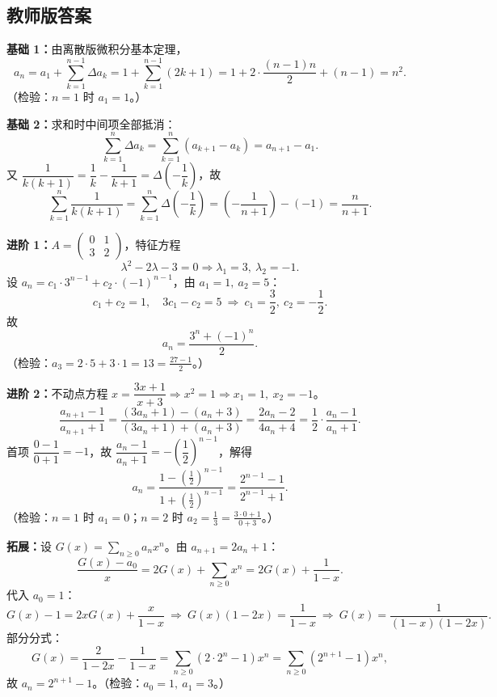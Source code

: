\begin{afterclass}
\subsection*{教师版答案}
\begin{solution}
\textbf{基础 1：}由离散版微积分基本定理，
\[
  a_n=a_1+\sum_{k=1}^{n-1}\Delta a_k
  =1+\sum_{k=1}^{n-1}(2k+1)
  =1+2\cdot\frac{(n-1)n}2+(n-1)=n^2 .
\]
（检验：$n=1$ 时 $a_1=1$。）
\end{solution}
\begin{solution}
\textbf{基础 2：}求和时中间项全部抵消：
\[
  \sum_{k=1}^n\Delta a_k=\sum_{k=1}^n(a_{k+1}-a_k)=a_{n+1}-a_1 .
\]
又 $\dfrac1{k(k+1)}=\dfrac1k-\dfrac1{k+1}=\Delta\!\left(-\dfrac1k\right)$，故
\[
  \sum_{k=1}^n\frac1{k(k+1)}
  =\sum_{k=1}^n\Delta\!\left(-\frac1k\right)
  =\left(-\frac1{n+1}\right)-(-1)=\frac n{n+1} .
\]
\end{solution}
\begin{solution}
\textbf{进阶 1：}$A=\begin{pmatrix}0&1\\3&2\end{pmatrix}$，特征方程
\[
  \lambda^2-2\lambda-3=0\Rightarrow\lambda_1=3,\ \lambda_2=-1 .
\]
设 $a_n=c_1\cdot3^{n-1}+c_2\cdot(-1)^{n-1}$，由 $a_1=1,\ a_2=5$：
\[
  c_1+c_2=1,\quad 3c_1-c_2=5
  \ \Rightarrow\ c_1=\frac32,\ c_2=-\frac12 .
\]
故
\[
  a_n=\frac{3^n+(-1)^n}2 .
\]
（检验：$a_3=2\cdot5+3\cdot1=13=\frac{27-1}2$。）
\end{solution}
\begin{solution}
\textbf{进阶 2：}不动点方程 $x=\dfrac{3x+1}{x+3}\Rightarrow x^2=1\Rightarrow x_1=1,\ x_2=-1$。
\[
  \frac{a_{n+1}-1}{a_{n+1}+1}
  =\frac{(3a_n+1)-(a_n+3)}{(3a_n+1)+(a_n+3)}
  =\frac{2a_n-2}{4a_n+4}
  =\frac12\cdot\frac{a_n-1}{a_n+1} .
\]
首项 $\dfrac{0-1}{0+1}=-1$，故 $\dfrac{a_n-1}{a_n+1}=-\left(\dfrac12\right)^{n-1}$，解得
\[
  a_n=\frac{1-\left(\frac12\right)^{n-1}}{1+\left(\frac12\right)^{n-1}}
  =\frac{2^{n-1}-1}{2^{n-1}+1} .
\]
（检验：$n=1$ 时 $a_1=0$；$n=2$ 时 $a_2=\frac13=\frac{3\cdot0+1}{0+3}$。）
\end{solution}
\begin{solution}
\textbf{拓展：}设 $G(x)=\sum_{n\ge0}a_nx^n$。由 $a_{n+1}=2a_n+1$：
\[
  \frac{G(x)-a_0}{x}=2G(x)+\sum_{n\ge0}x^n=2G(x)+\frac1{1-x} .
\]
代入 $a_0=1$：
\[
  G(x)-1=2xG(x)+\frac{x}{1-x}
  \ \Rightarrow\
  G(x)(1-2x)=\frac1{1-x}
  \ \Rightarrow\
  G(x)=\frac1{(1-x)(1-2x)} .
\]
部分分式：
\[
  G(x)=\frac2{1-2x}-\frac1{1-x}
  =\sum_{n\ge0}(2\cdot2^n-1)x^n
  =\sum_{n\ge0}(2^{n+1}-1)x^n ,
\]
故 $a_n=2^{n+1}-1$。（检验：$a_0=1,\ a_1=3$。）
\end{solution}

\end{afterclass}

